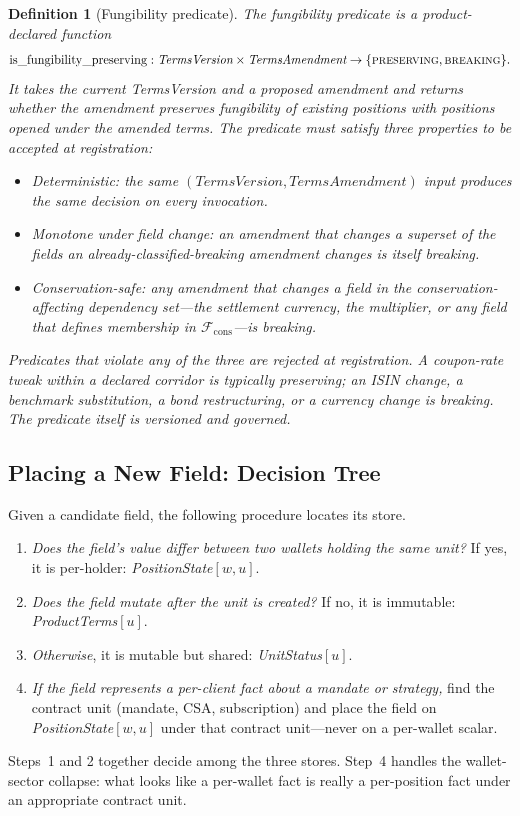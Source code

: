 \documentclass[11pt,a4paper]{article}
\newtheorem{definition}{Definition}[section]
\begin{document}
\begin{definition}[Fungibility predicate]
\label{def:fungibility}
The \emph{fungibility predicate} is a product-declared function
\[
\mathrm{is\_fungibility\_preserving} : \textit{TermsVersion} \times \textit{TermsAmendment} \to \{\textsc{preserving}, \textsc{breaking}\}.
\]
It takes the current \textit{TermsVersion} and a proposed amendment and returns whether the amendment preserves fungibility of existing positions with positions opened under the amended terms. The predicate must satisfy three properties to be accepted at registration:
\begin{itemize}[leftmargin=*,nosep]
\item \emph{Deterministic:} the same $(\mathit{TermsVersion}, \mathit{TermsAmendment})$ input produces the same decision on every invocation.
\item \emph{Monotone under field change:} an amendment that changes a superset of the fields an already-classified-breaking amendment changes is itself breaking.
\item \emph{Conservation-safe:} any amendment that changes a field in the conservation-affecting dependency set---the settlement currency, the multiplier, or any field that defines membership in $\mathcal{F}_{\mathrm{cons}}$---is breaking.
\end{itemize}
Predicates that violate any of the three are rejected at registration. A coupon-rate tweak within a declared corridor is typically preserving; an ISIN change, a benchmark substitution, a bond restructuring, or a currency change is breaking. The predicate itself is versioned and governed.
\end{definition}

\subsection{Placing a New Field: Decision Tree}
\label{sec:decisiontree}

Given a candidate field, the following procedure locates its store.
\begin{enumerate}[leftmargin=*]
\item \emph{Does the field's value differ between two wallets holding the same unit?} If yes, it is per-holder: \textit{PositionState}$[w, u]$.
\item \emph{Does the field mutate after the unit is created?} If no, it is immutable: \textit{ProductTerms}$[u]$.
\item \emph{Otherwise}, it is mutable but shared: \textit{UnitStatus}$[u]$.
\item \emph{If the field represents a per-client fact about a mandate or strategy,} find the contract unit (mandate, CSA, subscription) and place the field on \textit{PositionState}$[w, u]$ under that contract unit---never on a per-wallet scalar.
\end{enumerate}
Steps~1 and 2 together decide among the three stores. Step~4 handles the wallet-sector collapse: what looks like a per-wallet fact is really a per-position fact under an appropriate contract unit.
\end{document}
